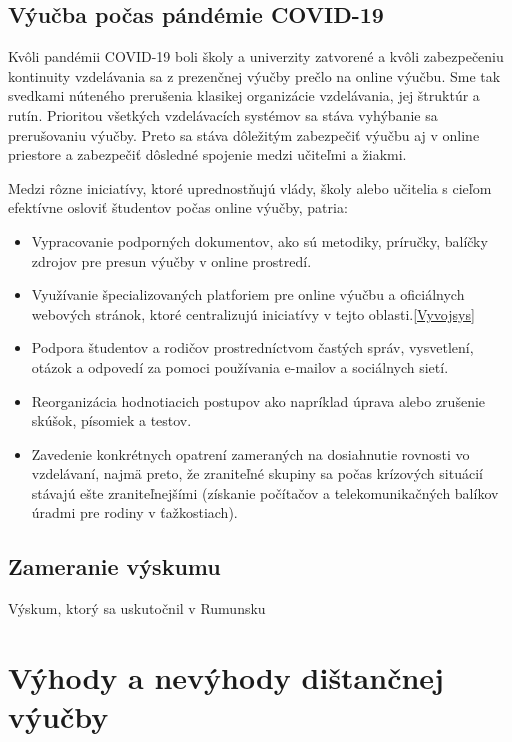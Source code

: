 \documentclass[10pt,oneside,slovak,a4paper]{article}
\begin{document}
\subsection{Výučba počas pándémie COVID-19} %
Kvôli pandémii COVID-19 boli školy a univerzity zatvorené a kvôli zabezpečeniu kontinuity vzdelávania sa z prezenčnej výučby prečlo na online výučbu.\cite{covid19}
Sme tak svedkami núteného prerušenia klasikej organizácie vzdelávania, jej štruktúr a rutín.
Prioritou všetkých vzdelávacích systémov sa stáva vyhýbanie sa prerušovaniu výučby. Preto sa stáva dôležitým zabezpečiť 
výučbu aj v online priestore a zabezpečiť dôsledné spojenie medzi učiteľmi a žiakmi.

Medzi rôzne iniciatívy, ktoré uprednostňujú vlády, školy alebo učitelia s cieľom efektívne osloviť študentov počas online výučby, patria:
\begin{itemize}
	\item Vypracovanie podporných dokumentov, ako sú metodiky, príručky, balíčky zdrojov pre presun výučby v online prostredí.
	\item Využívanie špecializovaných platforiem pre online výučbu  a oficiálnych webových stránok, ktoré centralizujú iniciatívy v tejto oblasti.\ref{Vyvojsys}%
	\item Podpora študentov a rodičov prostredníctvom častých správ, vysvetlení, otázok a odpovedí za pomoci používania e-mailov a sociálnych sietí.
	\item Reorganizácia hodnotiacich postupov ako napríklad úprava alebo zrušenie skúšok, písomiek a testov.
	\item Zavedenie konkrétnych opatrení zameraných na dosiahnutie rovnosti vo vzdelávaní, najmä preto, že zraniteľné skupiny sa počas krízových situácií stávajú ešte zraniteľnejšími (získanie počítačov a telekomunikačných balíkov úradmi pre rodiny v ťažkostiach).
\end{itemize}

\subsection{Zameranie výskumu}
Výskum, ktorý sa uskutočnil v Rumunsku 

\section{Výhody a nevýhody dištančnej výučby}
\end{document}
